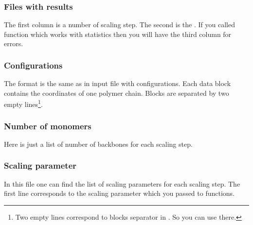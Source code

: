 \documentclass[12pt]{article}
\begin{document}
\begin{mySection}
\subsubsection{Files with results}
The first column is a number of scaling step. The second is the . If you called   function which works with statistics then you will have the third column for errors.

\subsubsection{Configurations}
The format is the same as in input file with configurations. Each data block contains the coordinates of one polymer chain. Blocks are separated by two empty lines\footnote{Two empty lines correspond to blocks separator in . So you can use  there.}.

\subsubsection{Number of monomers}
Here is just a list of number of backbones for each scaling step. 

\subsubsection{Scaling parameter}
In this file one can find the list of scaling parameters for each scaling step. The first line corresponds to the scaling parameter which you passed to  functions.



\end{mySection}


\end{document}
